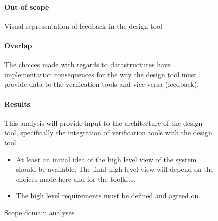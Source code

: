 \begin{figure}[!h]
{\begin{boxedminipage}[b]{.32\textwidth}
{	    \paragraph{Out of scope} Visual representation of feedback in the design tool
	    \paragraph{Overlap} The choices made with regards to datastructures have
	    implementation consequences for the way the design tool must provide data to the
	    verification tools and vice versa (feedback).
	    \paragraph{Results} This analysis will provide input to the architecture of the
	    design tool, specifically the integration of verification tools with the design
	    tool.
	}%
    \end{boxedminipage}
    }%

    \begin{boxedminipage}[c]{.8\textwidth}
    \begin{itemize}
	\item At least an initial idea of the high level view of the system
should be available. The final high level
		view will depend on the choices made here and for the toolkits.
	\item The high level requirements must be defined and agreed on.
    \end{itemize}
    \end{boxedminipage}


    \caption{Scope domain analyses}
    \label{fig: domain-analysis}
\end{figure}
